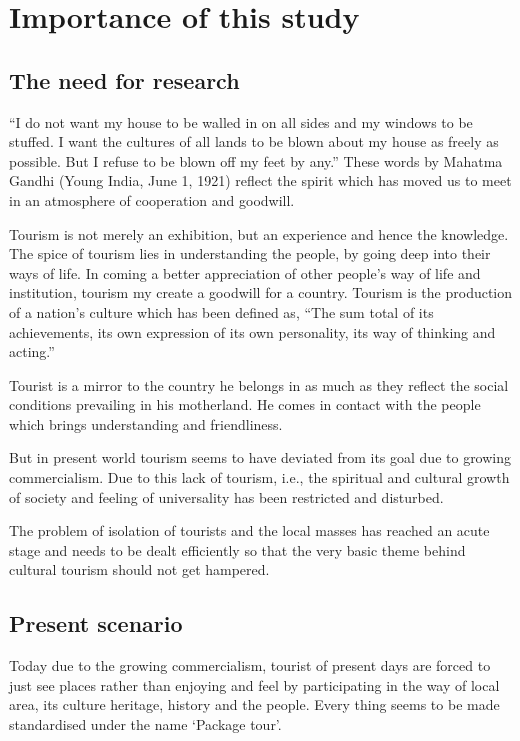 \chapter{Importance of this study} %
\label{cha:ios}

\section{The need for research} %
\label{sec:nfr}

``I do not want my house to be walled in on all sides and my windows to be stuffed. I want the cultures of all lands to be blown about my house as freely as possible. But I refuse to be blown off my feet by any.'' These words by Mahatma Gandhi (Young India, June 1, 1921) reflect the spirit which has moved us to meet in an atmosphere of cooperation and goodwill.

Tourism is not merely an exhibition, but an experience and hence the knowledge. The spice of tourism lies in understanding the people, by going deep into their ways of life. In coming a better appreciation of other people's way of life and institution, tourism my create a goodwill for a country. Tourism is the production of a nation's culture which has been defined as, ``The sum total of its achievements, its own expression of its own personality, its way of thinking and acting.''

Tourist is a mirror to the country he belongs in as much as they reflect the social conditions prevailing in his motherland. He comes in contact with the people which brings understanding and friendliness.

But in present world tourism seems to have deviated from its goal due to growing commercialism. Due to this lack of tourism, i.e., the spiritual and cultural growth of society and feeling of universality has been restricted and disturbed.

The problem of isolation of tourists and the local masses has reached an acute stage and needs to be dealt efficiently so that the very basic theme behind cultural tourism should not get hampered.


\section{Present scenario} %
\label{sec:psc}

Today due to the growing commercialism, tourist of present days are forced to just see places rather than enjoying and feel by participating in the way of local area, its culture heritage, history and the people. Every thing seems to be made standardised under the name `Package tour'.

